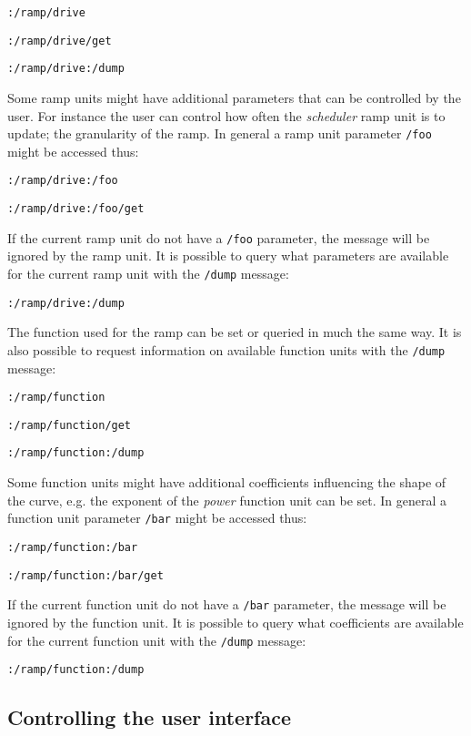 \documentclass{NIME-alternate}
\begin{document}
\texttt{:/ramp/drive}

\texttt{:/ramp/drive/get}

\texttt{:/ramp/drive:/dump}

Some ramp units might have additional parameters that can be controlled by the user. For instance the user can control how often the \emph{scheduler} ramp unit is to update; the granularity of the ramp.  In general a ramp unit parameter \texttt{/foo} might be accessed thus:


\texttt{:/ramp/drive:/foo}

\texttt{:/ramp/drive:/foo/get}

If the current ramp unit do not have a \texttt{/foo} parameter, the message will be ignored by the ramp unit. It is possible to query what parameters are available for the current ramp unit with the \texttt{/dump} message:

\texttt{:/ramp/drive:/dump}

The function used for the ramp can be set or queried in much the same way. It is also possible to request information on available function units with the \texttt{/dump} message:

\texttt{:/ramp/function}

\texttt{:/ramp/function/get}

\texttt{:/ramp/function:/dump}

Some function units might have additional coefficients influencing the shape of the curve, e.g. the exponent of the \emph{power} function unit can be set. In general a function unit parameter \texttt{/bar} might be accessed thus:

\texttt{:/ramp/function:/bar}

\texttt{:/ramp/function:/bar/get}

If the current function unit do not have a \texttt{/bar} parameter, the message will be ignored by the function unit. It is possible to query what coefficients are available for the current function unit with the \texttt{/dump} message:

\texttt{:/ramp/function:/dump}





\subsection{Controlling the user interface} %
\label{sub:controlling_the_user_interface}
\end{document}
